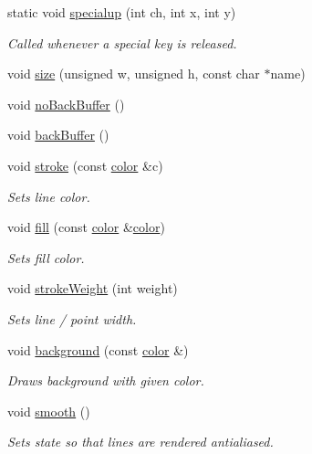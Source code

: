 \begin{DoxyCompactItemize}
static void \hyperlink{namespacecprocessing_af02bc302506ac700a3a297172dcb15d6}{specialup} (int ch, int x, int y)
\begin{DoxyCompactList}\small\item\em \-Called whenever a special key is released. \end{DoxyCompactList}\item 
void \hyperlink{namespacecprocessing_a4bbf578baacdd32fea5fab20517028ce}{size} (unsigned w, unsigned h, const char $\ast$name)
\item 
void \hyperlink{namespacecprocessing_a3f943a28dd1ecc7804bc93a60e6d8e91}{no\-Back\-Buffer} ()
\item 
void \hyperlink{namespacecprocessing_a8ae4be814d783b05ef6be38d33de6cb6}{back\-Buffer} ()
\item 
void \hyperlink{namespacecprocessing_af815879b404059ab470b9c33355d084f}{stroke} (const \hyperlink{classcprocessing_1_1color}{color} \&c)
\begin{DoxyCompactList}\small\item\em \-Sets line color. \end{DoxyCompactList}\item 
void \hyperlink{namespacecprocessing_a0cdae921f6061ef2e6574ba2d3a08fe3}{fill} (const \hyperlink{classcprocessing_1_1color}{color} \&\hyperlink{classcprocessing_1_1color}{color})
\begin{DoxyCompactList}\small\item\em \-Sets fill color. \end{DoxyCompactList}\item 
void \hyperlink{namespacecprocessing_a80f508e91c571079b7632c808246e85f}{stroke\-Weight} (int weight)
\begin{DoxyCompactList}\small\item\em \-Sets line / point width. \end{DoxyCompactList}\item 
void \hyperlink{namespacecprocessing_ac8cb10897d638434fd395afe0da61e7e}{background} (const \hyperlink{classcprocessing_1_1color}{color} \&)
\begin{DoxyCompactList}\small\item\em \-Draws background with given color. \end{DoxyCompactList}\item 
void \hyperlink{namespacecprocessing_a3078c9359807ad49550d1d0961827f3d}{smooth} ()
\begin{DoxyCompactList}\small\item\em \-Sets state so that lines are rendered antialiased. \end{DoxyCompactList}\item 

\end{DoxyCompactItemize}
